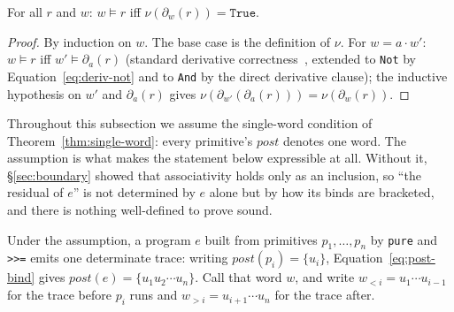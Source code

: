 \documentclass[acmsmall,screen]{acmart}
\newcommand{\post}{\mathit{post}}
\begin{document}
\begin{lemma}
\label{lem:deriv-correct}
For all $r$ and $w$: $w \models r$ iff $\nu(\partial_w(r)) = \mathtt{True}$.
\end{lemma}
\begin{proof}
By induction on $w$. The base case is the definition of $\nu$.
For $w = a \cdot w'$: $w \models r$ iff $w' \models \partial_a(r)$
(standard derivative correctness~\cite{brzozowski1964}, extended to
\lstinline{Not} by Equation~\eqref{eq:deriv-not} and to \lstinline{And}
by the direct derivative clause); the inductive hypothesis on $w'$ and
$\partial_a(r)$ gives $\nu(\partial_{w'}(\partial_a(r))) = \nu(\partial_w(r))$.
\end{proof}

Throughout this subsection we assume the single-word condition of
Theorem~\ref{thm:single-word}: every primitive's $\post$ denotes one word.
The assumption is what makes the statement below expressible at all.
Without it, \S\ref{sec:boundary} showed that associativity holds only as an
inclusion, so ``the residual of $e$'' is not determined by $e$ alone but by
how its binds are bracketed, and there is nothing well-defined to prove
sound.

Under the assumption, a program $e$ built from primitives
$p_1, \dots, p_n$ by \lstinline{pure} and \lstinline{>>=} emits one
determinate trace: writing $\post(p_i) = \{u_i\}$, Equation~\eqref{eq:post-bind}
gives $\post(e) = \{u_1 u_2 \cdots u_n\}$.
Call that word $w$, and write $w_{<i} = u_1 \cdots u_{i-1}$ for the trace
before $p_i$ runs and $w_{>i} = u_{i+1} \cdots u_n$ for the trace after.
\end{document}
